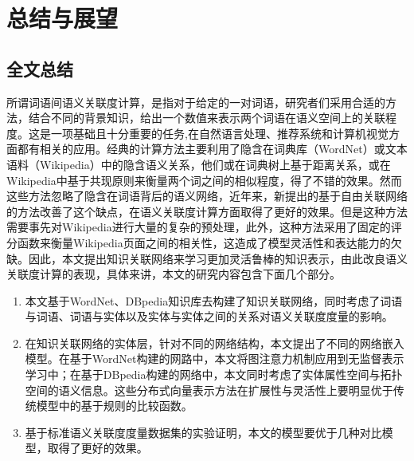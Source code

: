 \chapter{总结与展望}
\label{chap:chap07}

\section{全文总结}

所谓词语间语义关联度计算，是指对于给定的一对词语，研究者们采用合适的方法，结合不同的背景知识，给出一个数值来表示两个词语在语义空间上的关联程度。这是一项基础且十分重要的任务,在自然语言处理、推荐系统和计算机视觉方面都有相关的应用。经典的计算方法主要利用了隐含在词典库（WordNet）或文本语料（Wikipedia）中的隐含语义关系，他们或在词典树上基于距离关系，或在Wikipedia中基于共现原则来衡量两个词之间的相似程度，得了不错的效果。然而这些方法忽略了隐含在词语背后的语义网络，近年来，新提出的基于自由关联网络的方法改善了这个缺点，在语义关联度计算方面取得了更好的效果。但是这种方法需要事先对Wikipedia进行大量的复杂的预处理，此外，这种方法采用了固定的评分函数来衡量Wikipedia页面之间的相关性，这造成了模型灵活性和表达能力的欠缺。因此，本文提出知识关联网络来学习更加灵活鲁棒的知识表示，由此改良语义关联度计算的表现，具体来讲，本文的研究内容包含下面几个部分。
\begin{enumerate}
    \item 本文基于WordNet、DBpedia知识库去构建了知识关联网络，同时考虑了词语与词语、词语与实体以及实体与实体之间的关系对语义关联度度量的影响。
    \item 在知识关联网络的实体层，针对不同的网络结构，本文提出了不同的网络嵌入模型。在基于WordNet构建的网路中，本文将图注意力机制应用到无监督表示学习中；在基于DBpedia构建的网络中，本文同时考虑了实体属性空间与拓扑空间的语义信息。这些分布式向量表示方法在扩展性与灵活性上要明显优于传统模型中的基于规则的比较函数。
    \item 基于标准语义关联度度量数据集的实验证明，本文的模型要优于几种对比模型，取得了更好的效果。
\end{enumerate}

